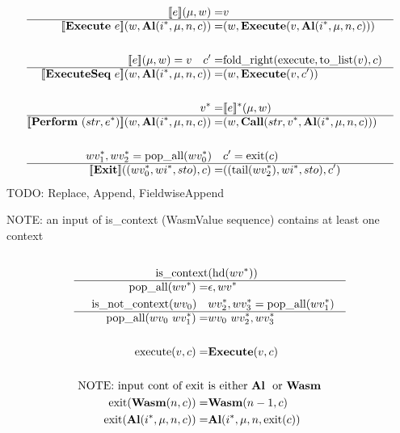 \begin{align*}
%
\newline \\
  \sem{e}(\mu, w) =& v \\
  \hline
  \sem{\textbf{Execute} ~ e}(w, \al (\seq{i}, \mu, n, c))
  =&
  (w, \exe (v, \al (\seq{i}, \mu, n, c))) \\
%
\newline \\
  \sem{e}(\mu, w) = v \quad
  c' =& \text{fold\_right}(\text{execute}, \text{to\_list}(v), c) \\
  \hline
  \sem{\textbf{ExecuteSeq} ~ e}(w, \al (\seq{i}, \mu, n, c))
  =&
  (w, \exe (v, c')) \\
%
\newline \\
  \seq v =& \seq{\sem{e}}(\mu, w) \\
  \hline
  \sem{\textbf{Perform} ~ (str, \seq e)}(w, \al (\seq{i}, \mu, n, c))
  =&
  (w, \call (str, \seq v, \al (\seq{i}, \mu, n, c))) \\
%
\newline \\
  \seq{wv_1}, \seq{wv_2} = \text{pop\_all}(\seq{wv_0}) \quad&
  c' = \text{exit}(c)\\
  \hline
  \sem{\textbf{Exit}}((\seq{wv_0}, \seq{wi}, sto), c)
  =&
  ((\text{tail}(\seq{wv_2}), \seq{wi}, sto), c') \\
\end{align*}
TODO: Replace, Append, FieldwiseAppend

NOTE: an input of is\_context (WasmValue sequence) contains at least one context
\begin{align*}
%
\newline \\
  \text{is\_context}&(\text{hd}(\seq{wv})) \\
  \hline
  \text{pop\_all}(\seq{wv}) =& \epsilon, \seq{wv} \\
%
  \text{is\_not\_context}(wv_0) \quad& \seq{wv_2}, \seq{wv_3} = \text{pop\_all}(\seq{wv_1}) \\
  \hline
  \text{pop\_all}(wv_0 ~ \seq{wv_1}) =& wv_0 ~ \seq{wv_2}, \seq{wv_3} \\
%
\newline \\
  \text{execute}(v, c) =& \exe(v, c) \\
%
\newline \\
\text{
  NOTE: input cont of exit }&\text{is either \al ~ or \wasm
} \\
  \text{exit}(\wasm (n, c)) =& \wasm(n-1, c) \\
%
  \text{exit}(\al (\seq i, \mu, n, c)) =& \al (\seq i, \mu, n, \text{exit}(c)) \\
\end{align*}





